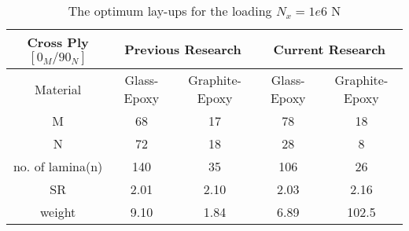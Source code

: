 \begin{table*}[!htb]
\caption{The optimum lay-ups for the loading $N_x=1e6$ N}
\centering
\begin{adjustbox}{width=1\textwidth}
	\begin{tabular}{c|cc|cc}
		\toprule
		Cross Ply $[0_M/90_N]$         & \multicolumn{2}{c}{Previous Research} & \multicolumn{2}{c}{Current Research} \\
		\midrule																								  
		 Material       &  Glass-Epoxy & Graphite-Epoxy  & Glass-Epoxy & Graphite-Epoxy      \\ 
			  M         &  68          &    17           &  78		    &  18             \\
			  N         &  72          &    18           &  28		    &  8              \\
	no. of lamina(n)    &  140         &    35           &  106	    &  26                     \\
			 SR         &  2.01        &    2.10         &  2.03	    &  2.16            \\
		 weight         &  9.10        &    1.84         &  6.89	    &  102.5           \\
		\bottomrule
	\end{tabular}
\end{adjustbox}
\label{tab:comparsion}
\end{table*}
